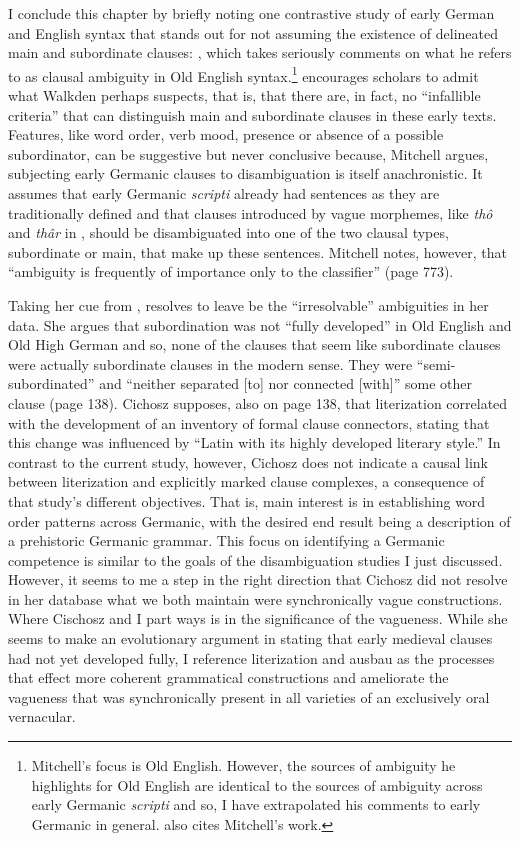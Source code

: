 I conclude this chapter by briefly noting one contrastive study of early German and English syntax that stands out for not assuming the existence of delineated main and subordinate clauses: \citet{Cichosz2010}, which takes seriously  comments on what he refers to as clausal ambiguity in Old English syntax.\footnote{{Mitchell’s focus is Old English. However, the sources of ambiguity he highlights for Old English are identical to the sources of ambiguity across early Germanic} {\textit{scripti}} {and so, I have extrapolated his comments to early Germanic in general. \citet{Cichosz2010} also cites Mitchell’s work.} } \citet[769--773]{Mitchell1985} encourages scholars to admit what Walkden perhaps suspects, that is, that there are, in fact, no “infallible criteria” that can distinguish main and subordinate clauses in these early texts. Features, like word order, verb mood, presence or absence of a possible subordinator, can be suggestive but never conclusive because, Mitchell argues, subjecting early Germanic clauses to disambiguation is itself anachronistic. It assumes that early Germanic \textit{scripti} already had sentences as they are traditionally defined and that clauses introduced by vague morphemes, like \textit{thô} and \textit{thâr} in , should be disambiguated into one of the two clausal types, subordinate or main, that make up these sentences. Mitchell notes, however, that “ambiguity is frequently of importance only to the classifier” (page 773).

Taking her cue from \citet{Mitchell1985}, \citet{Cichosz2010} resolves to leave be the “irresolvable” ambiguities in her data. She argues that subordination was not “fully developed” in Old English and Old High German and so, none of the clauses that seem like subordinate clauses were actually subordinate clauses in the modern sense. They were “semi-subordinated” and “neither separated [to] nor connected [with]” some other clause (page 138). Cichosz supposes, also on page 138, that literization correlated with the development of an inventory of formal clause connectors, stating that this change was influenced by “Latin with its highly developed literary style.” In contrast to the current study, however, Cichosz does not indicate a causal link between literization and explicitly marked clause complexes, a consequence of that study’s different objectives. That is,  main interest is in establishing word order patterns across Germanic, with the desired end result being a description of a prehistoric Germanic grammar. This focus on identifying a Germanic competence is similar to the goals of the disambiguation studies I just discussed. However, it seems to me a step in the right direction that Cichosz did not resolve in her database what we both maintain were synchronically vague constructions. Where Cischosz and I part ways is in the significance of the vagueness. While she seems to make an evolutionary argument in stating that early medieval clauses had not yet developed fully, I reference literization and ausbau as the processes that effect more coherent grammatical constructions and ameliorate the vagueness that was synchronically present in all varieties of an exclusively oral vernacular.

